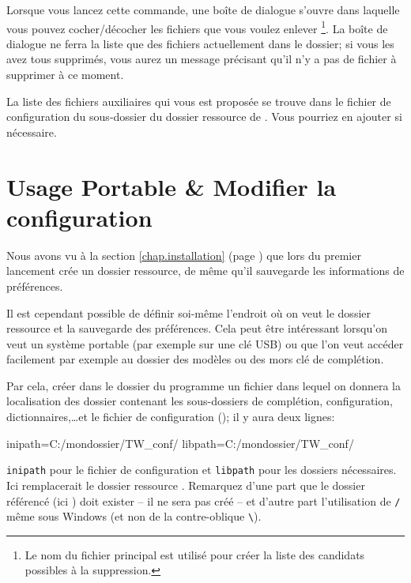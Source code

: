 Lorsque vous lancez cette commande, une boîte de dialogue s'ouvre dans laquelle vous pouvez cocher/décocher les fichiers que vous voulez enlever \footnote{Le nom du fichier principal est utilisé pour créer la liste des candidats possibles à la suppression.}. La boîte de dialogue ne ferra la liste que des fichiers actuellement dans le dossier; si vous les avez tous supprimés, vous aurez un message précisant qu'il n'y a pas de fichier à supprimer à ce moment.

La liste des fichiers auxiliaires qui vous est proposée se trouve dans le fichier de configuration  du sous-dossier  du dossier ressource de \Tw. Vous pourriez en ajouter si nécessaire.

\section{Usage Portable \& Modifier la configuration}
\label{sec.portable_configuration}

Nous avons vu à la section \ref{chap.installation} (page \pageref{chap.installation}) que lors du premier lancement \Tw{} crée un dossier ressource, de même qu'il sauvegarde les informations de préférences.

Il est cependant possible de définir soi-même l'endroit où on veut le dossier ressource et la sauvegarde des préférences. Cela peut être intéressant lorsqu'on veut un système portable (par exemple sur une clé USB) ou que l'on veut accéder facilement par exemple au dossier des modèles ou des mors clé de complétion.

Par cela, créer dans le dossier du programme un fichier  dans lequel on donnera la localisation des dossier contenant les sous-dossiers de complétion, configuration, dictionnaires,\dots et le fichier de configuration (); il y aura deux lignes:
\begin{verbExample}
inipath=C:/mondossier/TW_conf/
libpath=C:/mondossier/TW_conf/
\end{verbExample}

\verb|inipath| pour le fichier de configuration et \verb|libpath| pour les dossiers nécessaires. Ici  remplacerait le dossier ressource . Remarquez d'une part que le dossier référencé (ici ) doit exister -- il ne sera pas créé -- et d'autre part l'utilisation de \verb|/| même sous Windows (et non de la contre-oblique \verb+\+).

